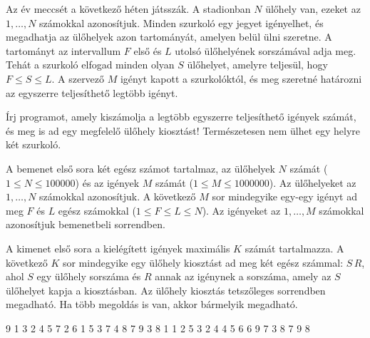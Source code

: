 





Az év meccsét a következő héten játsszák. A stadionban $N$ ülőhely van, ezeket az $1, \ldots, N$ számokkal azonosítjuk. Minden szurkoló egy jegyet igényelhet, és megadhatja az ülőhelyek azon tartományát, amelyen belül ülni szeretne. A tartományt az intervallum $F$ első és $L$ utolsó ülőhelyének sorszámával adja meg. Tehát a szurkoló elfogad minden olyan $S$ ülőhelyet, amelyre teljesül, hogy $F \leq S \leq L$. A szervező $M$ igényt kapott a szurkolóktól, és meg szeretné határozni az egyszerre teljesíthető legtöbb igényt.

Írj programot, amely kiszámolja a legtöbb egyszerre teljesíthető igények számát, és meg is ad egy megfelelő ülőhely kiosztást! Természetesen nem ülhet egy helyre két szurkoló.

A bemenet első sora két egész számot tartalmaz, az ülőhelyek $N$ számát ($1 \leq N \leq 100000$) és az igények $M$ számát ($1 \leq M \leq 1000000$). Az ülőhelyeket az $1, \ldots, N$ számokkal azonosítjuk. A következő $M$ sor mindegyike egy-egy igényt ad meg $F$ és $L$ egész számokkal ($1 \leq F \leq L \leq N$). Az igényeket az $1,\ldots,M$ számokkal azonosítjuk bemenetbeli sorrendben.

A kimenet első sora a kielégített igények maximális $K$ számát tartalmazza. A következő $K$ sor mindegyike egy ülőhely kiosztást ad meg két egész számmal: $S\,R$, ahol $S$ egy ülőhely sorszáma és $R$ annak az igénynek a sorszáma, amely az $S$ ülőhelyet kapja a kiosztásban. Az ülőhely kiosztás tetszőleges sorrendben megadható. Ha több megoldás is van, akkor bármelyik megadható.

 9
1 3
2 4
5 7
2 6
1 5
3 7
4 8
7 9
3 8
1 1
2 5
3 2
4 4
5 6
6 9
7 3
8 7
9 8
\sampleCOMMENT

\sampleEND


